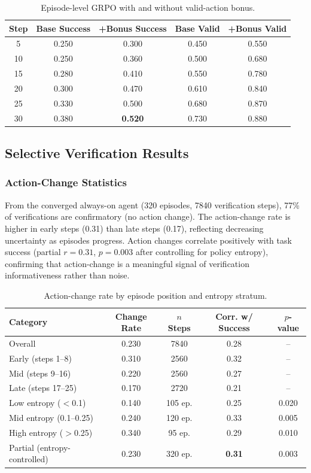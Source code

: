 \documentclass[11pt]{article}
\begin{document}
\begin{table}[h]
\centering
\caption{Episode-level GRPO with and without valid-action bonus.}
\label{tab:bonus}
\begin{tabular}{ccccc}
\toprule
Step & Base Success & +Bonus Success & Base Valid & +Bonus Valid \\
\midrule
5  & 0.250 & 0.300 & 0.450 & 0.550 \\
10 & 0.250 & 0.360 & 0.500 & 0.680 \\
15 & 0.280 & 0.410 & 0.550 & 0.780 \\
20 & 0.300 & 0.470 & 0.610 & 0.840 \\
25 & 0.330 & 0.500 & 0.680 & 0.870 \\
30 & 0.380 & \textbf{0.520} & 0.730 & 0.880 \\
\bottomrule
\end{tabular}
\end{table}

\subsection{Selective Verification Results}

\subsubsection{Action-Change Statistics}

From the converged always-on agent (320 episodes, 7840 verification steps), 77\% of verifications are confirmatory (no action change). The action-change rate is higher in early steps (0.31) than late steps (0.17), reflecting decreasing uncertainty as episodes progress. Action changes correlate positively with task success (partial $r = 0.31$, $p = 0.003$ after controlling for policy entropy), confirming that action-change is a meaningful signal of verification informativeness rather than noise.

\begin{table}[h]
\centering
\caption{Action-change rate by episode position and entropy stratum.}
\label{tab:actionchange}
\begin{tabular}{lcccc}
\toprule
Category & Change Rate & $n$ Steps & Corr. w/ Success & $p$-value \\
\midrule
Overall & 0.230 & 7840 & 0.28 & -- \\
Early (steps 1--8) & 0.310 & 2560 & 0.32 & -- \\
Mid (steps 9--16) & 0.220 & 2560 & 0.27 & -- \\
Late (steps 17--25) & 0.170 & 2720 & 0.21 & -- \\
\midrule
Low entropy ($<$0.1) & 0.140 & 105 ep. & 0.25 & 0.020 \\
Mid entropy (0.1--0.25) & 0.240 & 120 ep. & 0.33 & 0.005 \\
High entropy ($>$0.25) & 0.340 & 95 ep. & 0.29 & 0.010 \\
Partial (entropy-controlled) & 0.230 & 320 ep. & \textbf{0.31} & 0.003 \\
\bottomrule
\end{tabular}
\end{table}
\end{document}

